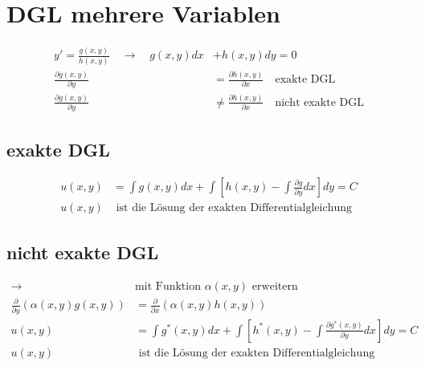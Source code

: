 \section{DGL mehrere Variablen}

\begin{align*}
y' = \frac{g(x,y)}{h(x,y)} \quad\rightarrow\quad g(x,y)dx &+ h(x,y)dy = 0\\
\frac{\partial g(x,y)}{\partial y} &= \frac{\partial h(x,y)}{\partial x}\quad\text{exakte DGL}\\
\frac{\partial g(x,y)}{\partial y} &\neq \frac{\partial h(x,y)}{\partial x}\quad\text{nicht exakte DGL}
\end{align*}

\subsection{exakte DGL}

\begin{align*}
	u(x,y) &= \int g(x,y)dx + \int\left[h(x,y)-\int\frac{\partial g}{\partial y}dx\right]dy = C\\
	u(x,y) &\text{ ist die Lösung der exakten Differentialgleichung}
\end{align*}

\subsection{nicht exakte DGL}

\begin{align*}
\rightarrow&\text{mit Funktion $\alpha(x,y)$ erweitern}\\
\frac{\partial}{\partial y}\left(\alpha(x,y)g(x,y)\right) &= \frac{\partial}{\partial x}\left(\alpha(x,y)h(x,y)\right)\\
u(x,y) &= \int g^{*}(x,y)dx + \int\left[h^{*}(x,y)-\int\frac{\partial g^{*}(x,y)}{\partial y}dx\right]dy = C\\
u(x,y) &\text{ ist die Lösung der exakten Differentialgleichung}
\end{align*}


